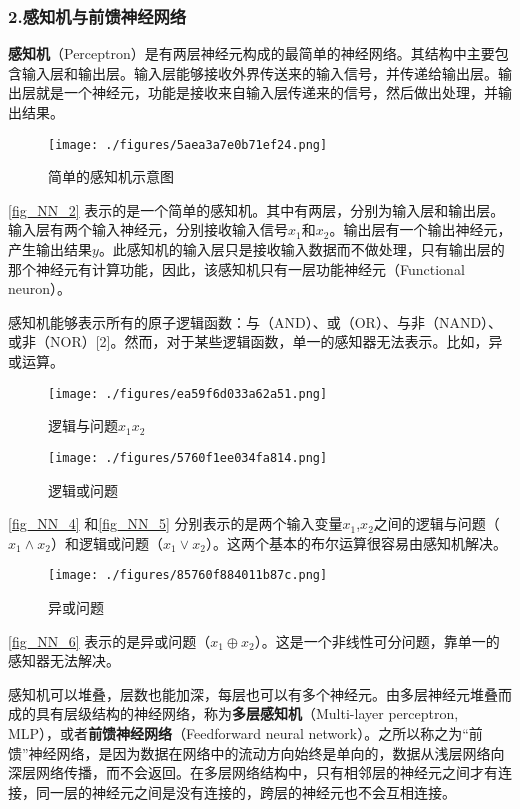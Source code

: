 \subsubsection{2.感知机与前馈神经网络}
\textbf{感知机}（Perceptron）是有两层神经元构成的最简单的神经网络。其结构中主要包含输入层和输出层。输入层能够接收外界传送来的输入信号，并传递给输出层。输出层就是一个神经元，功能是接收来自输入层传递来的信号，然后做出处理，并输出结果。
\begin{figure}[ht]
\centering
\texttt{[image: ./figures/5aea3a7e0b71ef24.png]}
\caption{简单的感知机示意图} \label{fig_NN_2}
\end{figure}
\autoref{fig_NN_2} 表示的是一个简单的感知机。其中有两层，分别为输入层和输出层。输入层有两个输入神经元，分别接收输入信号$x_1$和$x_2$。输出层有一个输出神经元，产生输出结果$y$。此感知机的输入层只是接收输入数据而不做处理，只有输出层的那个神经元有计算功能，因此，该感知机只有一层功能神经元（Functional neuron）。

感知机能够表示所有的原子逻辑函数：与（AND）、或（OR）、与非（NAND）、或非（NOR）[2]。然而，对于某些逻辑函数，单一的感知器无法表示。比如，异或运算。

\begin{figure}[ht]
\centering
\texttt{[image: ./figures/ea59f6d033a62a51.png]}
\caption{逻辑与问题$x_1x_2$} \label{fig_NN_4}
\end{figure}

\begin{figure}[ht]
\centering
\texttt{[image: ./figures/5760f1ee034fa814.png]}
\caption{逻辑或问题} \label{fig_NN_5}
\end{figure}

\autoref{fig_NN_4} 和\autoref{fig_NN_5} 分别表示的是两个输入变量$x_1$,$x_2$之间的逻辑与问题（$x_1 \wedge x_2$）和逻辑或问题（$x_1 \vee x_2$）。这两个基本的布尔运算很容易由感知机解决。

\begin{figure}[ht]
\centering
\texttt{[image: ./figures/85760f884011b87c.png]}
\caption{异或问题} \label{fig_NN_6}
\end{figure}
\autoref{fig_NN_6} 表示的是异或问题（$x_1 \oplus x_2$）。这是一个非线性可分问题，靠单一的感知器无法解决。

感知机可以堆叠，层数也能加深，每层也可以有多个神经元。由多层神经元堆叠而成的具有层级结构的神经网络，称为\textbf{多层感知机}（Multi-layer perceptron, MLP），或者\textbf{前馈神经网络}（Feedforward neural network）。之所以称之为“前馈”神经网络，是因为数据在网络中的流动方向始终是单向的，数据从浅层网络向深层网络传播，而不会返回。在多层网络结构中，只有相邻层的神经元之间才有连接，同一层的神经元之间是没有连接的，跨层的神经元也不会互相连接。

